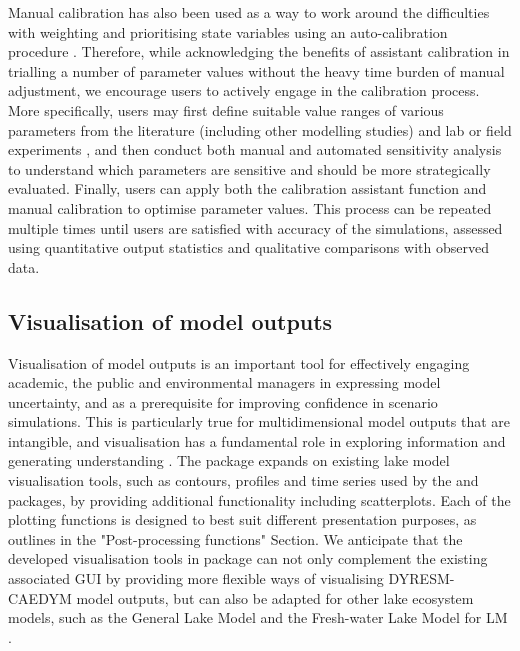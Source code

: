 Manual calibration has also been used as a way to work around the difficulties with weighting and prioritising state variables using an auto-calibration procedure \citep{lehmann2018modelling}. Therefore, while acknowledging the benefits of assistant calibration in trialling a number of parameter values without the heavy time burden of manual adjustment, we encourage users to actively engage in the calibration process. More specifically, users may first define suitable value ranges of various parameters from the literature (including other modelling studies) and lab or field experiments \citep{robson2018towards}, and then conduct both manual and automated sensitivity analysis to understand which parameters are sensitive and should be more strategically evaluated. Finally, users can apply both the calibration assistant function and manual calibration to optimise parameter values. This process can be repeated multiple times until users are satisfied with accuracy of the simulations, assessed using quantitative output statistics and qualitative comparisons with observed data.\par

\subsection{Visualisation of model outputs}

Visualisation of model outputs is an important tool for effectively engaging academic, the public and environmental managers in expressing model uncertainty, and as a prerequisite for improving confidence in scenario simulations. This is particularly true for multidimensional model outputs that are intangible, and visualisation has a fundamental role in exploring information and generating understanding \citep{mcinerny2014information}. The  package expands on existing lake model visualisation tools, such as contours, profiles and time series used by the  and  packages, by providing additional functionality including scatterplots. Each of the plotting functions is designed to best suit different presentation purposes, as outlines in the "Post-processing functions" Section. We anticipate that the developed visualisation tools in  package can not only complement the existing associated GUI by providing more flexible ways of visualising DYRESM-CAEDYM model outputs, but can also be adapted for other lake ecosystem models, such as the General Lake Model \citep{hipsey2019general} and the Fresh-water Lake Model for LM \citep{Mironov2010ImplementationOT}.\par

